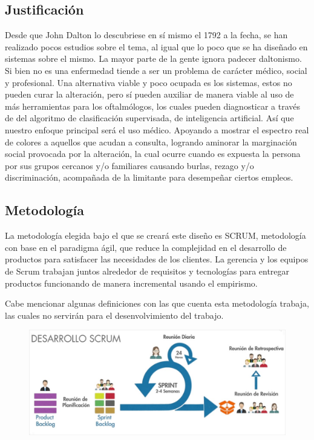 \documentclass[10pt]{article}
\begin{document}
\subsection{Justificación}

Desde que John Dalton lo descubriese en sí mismo el 1792 \cite{IEEEreferencias:Ref2} a la fecha, se han realizado pocos estudios sobre el tema, al igual que lo poco que se ha diseñado en sistemas sobre el mismo. La mayor parte de la gente ignora padecer daltonismo. Si bien no es una enfermedad tiende a ser un problema de carácter médico, social y profesional. Una alternativa viable y poco ocupada es los sistemas, estos no pueden curar la alteración, pero sí pueden auxiliar de manera viable al uso de más herramientas para los oftalmólogos, los cuales pueden diagnosticar a través de del algoritmo de clasificación supervisada, de inteligencia artificial. Así que nuestro enfoque principal será el uso médico. Apoyando a mostrar el espectro real de colores a aquellos que acudan a consulta, logrando aminorar la marginación social provocada por la alteración, la cual ocurre cuando es expuesta la persona por sus grupos cercanos y/o familiares causando burlas, rezago y/o discriminación, acompañada de la limitante para desempeñar ciertos empleos.

\subsection{Metodología}
La metodología elegida bajo el que se creará este diseño es SCRUM, metodología con base en el paradigma ágil, que reduce la complejidad en el desarrollo de productos para satisfacer las necesidades de los clientes. La gerencia y los equipos de Scrum trabajan juntos alrededor de requisitos y tecnologías para entregar productos funcionando de manera incremental usando el empirismo. 

Cabe mencionar algunas definiciones con las que cuenta esta metodología trabaja, las cuales no servirán para el desenvolvimiento del trabajo.

\begin{figure}[H]
	\begin{center}
\includegraphics[scale = 0.40]{Imagenes/desarrollo_scrum.jpg}
	\end{center} 
\end{figure}
\end{document}
